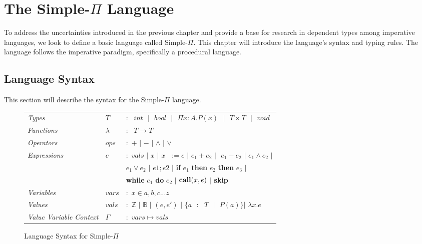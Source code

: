 \documentclass[a4paper,12pt]{report}
\begin{document}
\chapter{The Simple-$\Pi$ Language}
To address the uncertainties introduced in the previous chapter and provide a 
base for research in dependent types among imperative languages, we look to 
define a basic language called Simple-$\Pi$. This chapter will introduce 
the language's syntax and typing rules. The language follows 
the imperative paradigm, specifically a procedural language.

\section{Language Syntax}
This section will describe the syntax for the Simple-$\Pi$ language. 

\begin{figure}[H]
  \begin{center}
    \begin{tabular}{l l l}
      \textit{Types} & $T$ & $:\text{ }int\text{ }|\text{ }bool\text{ }|\text{ }\Pi x: A.P(x)
      \text{ }|\text{ }T \times T\text{ }|\text{ }void$\\
      \textit{Functions} & $\lambda$ & $:\text{ }T\longrightarrow T$\\
      \textit{Operators} & $ops$ & $:$ $+$ $|$ $-$ $|$ $\wedge$ $|$ $\vee$ \\
      \textit{Expressions} & $e$ & $:$ $vals$ $|$ $x$ $|$ $x\text{ }:= e$ $|$ 
      $e_1 + e_2$ $| \text{ }e_1 - e_2$ $|$ $e_1 \wedge e_2$ $|$ \\ 
      & & \; $e_1 \vee e_2$ $|$ $e1;e2$ $|$ \textbf{if} $e_1$ \textbf{then} $e_2$ \textbf{then} $e_3$ $|$\\
      & & \;  \textbf{while} $e_1$ \textbf{do} $e_2$ $|$ 
      $\text{\textbf{call}}(x, e)$ $|$ \textbf{skip}\\
      \textit{Variables} & $vars$& $:$ $x \in {a,b,c...z}$\\
      \textit{Values} & $vals$& $:$ $\mathbb{Z}$ $|$ $\mathbb{B}$ $|$ $(e, e')$ $|$ $\{a\text{ }:
      \text{ }T\text{ }|\text{ } P(a)\}$\text{ }$|$ $\lambda x.e$\\
      \textit{Value Variable Context} & $\Gamma$& $:$ $vars \mapsto vals$
    \end{tabular}
  \end{center}
  \caption{Language Syntax for Simple-$\Pi$}
\end{figure}
\end{document}
